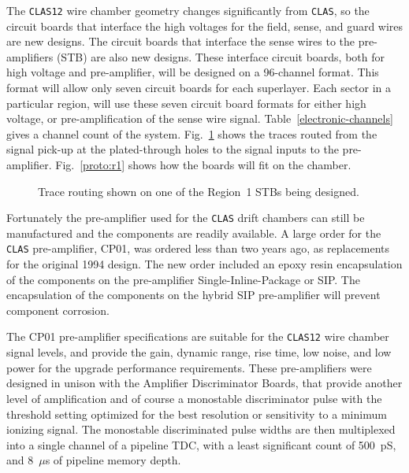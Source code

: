 \documentclass[12pt]{article}
\begin{document}
The {\tt CLAS12} wire chamber geometry changes significantly from {\tt CLAS}, 
so the circuit boards that interface the high voltages for the field, sense, 
and guard wires are new designs.  The circuit boards that interface the 
sense wires to the pre-amplifiers (STB) are also new designs.   These 
interface circuit boards, both for high voltage and pre-amplifier, will be 
designed on a 96-channel format.  This format will allow only seven circuit 
boards for each superlayer.  Each sector in a particular region, will use these 
seven circuit board formats for either high voltage, or pre-amplification of 
the sense wire signal.  Table~\ref{electronic-channels} gives a channel count 
of the system.  Fig.~\ref{r1stb} shows the traces routed from the signal pick-up
at the plated-through holes to the signal inputs to the pre-amplifier.
Fig.~\ref{proto:r1} shows how the boards will fit on the chamber.

\begin{figure}[htbp]
\vspace{10.0cm}
\caption{\small{Trace routing shown on one of the Region~1 STBs being
designed.}}
\label{r1stb}
\end{figure}

Fortunately the pre-amplifier used for the {\tt CLAS} drift chambers can still 
be manufactured and the components are readily available.  A large order 
for the {\tt CLAS} pre-amplifier, CP01, was ordered less than two years ago, 
as replacements for the original 1994 design.  The new order included an 
epoxy resin encapsulation of the components on the pre-amplifier 
Single-Inline-Package or SIP.  The encapsulation of the components on 
the hybrid SIP pre-amplifier will prevent component corrosion.

The CP01 pre-amplifier specifications are suitable for the {\tt CLAS12} wire 
chamber signal levels, and provide the gain, dynamic range, rise time, 
low noise, and low power for the upgrade performance requirements.  
These pre-amplifiers were designed in unison with the Amplifier 
Discriminator Boards, that provide another level of amplification and of 
course a monostable discriminator pulse with the threshold setting 
optimized for the best resolution or sensitivity to a minimum ionizing 
signal.  The monostable discriminated pulse widths are then multiplexed 
into a single channel of a pipeline TDC, with a least significant count 
of 500~pS, and 8~$\mu$s of pipeline memory depth.
\end{document}

